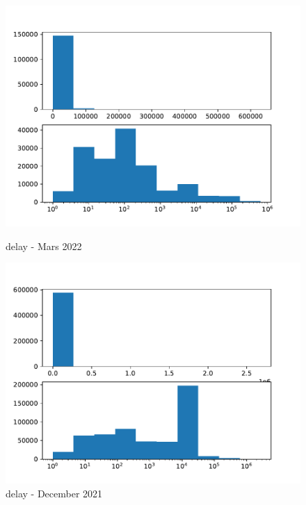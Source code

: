 \documentclass[a4paper]{article}
\begin{document}
\begin{figure}[H]
\begin{minipage}[b]{0.5\linewidth}
    \centering
    \includegraphics[width=1.11\linewidth]{MBSS/plot/Distribution/2022_03_delay.pdf} 
    \caption{delay - Mars 2022} 
    \vspace{4ex}
  \end{minipage}%
    \begin{minipage}[b]{0.5\linewidth}
    \centering
    \includegraphics[width=1.11\linewidth]{MBSS/plot/Distribution/2021_12_delay.pdf} 
    \caption{delay - December 2021} 
    \vspace{4ex}
  \end{minipage}%
\end{figure}
\end{document}
